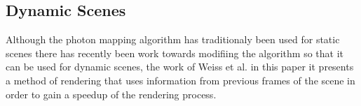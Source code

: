 \subsection{Dynamic Scenes}
Although the photon mapping algorithm has traditionaly been used for static scenes there has
recently been work towards modifiing the algorithm so that it can be used for dynamic scenes, the
work of Weiss et al. \cite{Weiss12} in this paper it presents a method of rendering that uses
information from previous frames of the scene in order to gain a speedup of the rendering process.
